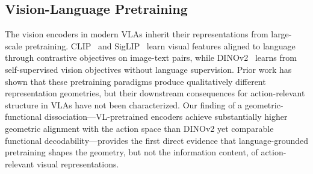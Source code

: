 \subsection{Vision-Language Pretraining}

The vision encoders in modern VLAs inherit their representations from large-scale pretraining.
CLIP~\cite{radford2021_clip} and SigLIP~\cite{zhai2023_siglip} learn visual features aligned to language through contrastive objectives on image-text pairs, while DINOv2~\cite{oquab2024_dinov2} learns from self-supervised vision objectives without language supervision.
Prior work has shown that these pretraining paradigms produce qualitatively different representation geometries, but their downstream consequences for action-relevant structure in VLAs have not been characterized.
Our finding of a geometric-functional dissociation---VL-pretrained encoders achieve substantially higher geometric alignment with the action space than DINOv2 yet comparable functional decodability---provides the first direct evidence that language-grounded pretraining shapes the geometry, but not the information content, of action-relevant visual representations.
